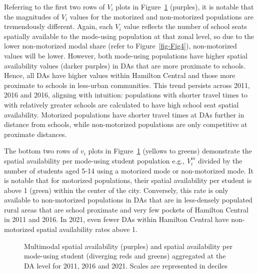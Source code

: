\documentclass[
default
]{sn-jnl}
\begin{document}
Referring to the first two rows of \(V_i\) plots in
Figure~\ref{fig-Fig7} (purples), it is notable that the magnitudes of
\(V_i\) values for the motorized and non-motorized populations are
tremendously different. Again, each \(V_i\) value reflects the number of
school seats spatially available to the mode-using population at that
zonal level, so due to the lower non-motorized modal share (refer to
Figure~\ref{fig-Fig4}), non-motorized values will be lower. However,
both mode-using populations have higher spatial availability values
(darker purples) in DAs that are more proximate to schools. Hence, all
DAs have higher values within Hamilton Central and those more proximate
to schools in less-urban communities. This trend persists across 2011,
2016 and 2016, aligning with intuition: populations with shorter travel
times to with relatively greater schools are calculated to have high
school seat spatial availability. Motorized populations have shorter
travel times at DAs further in distance from schools, while
non-motorized populations are only competitive at proximate distances.

The bottom two rows of \(v_i\) plots in Figure~\ref{fig-Fig7} (yellows
to greens) demonstrate the spatial availability per mode-using student
population e.g., \(V_i^m\) divided by the number of students aged 5-14
using a motorized mode or non-motorized mode. It is notable that for
motorized populations, their spatial availability per student is above 1
(green) within the center of the city. Conversely, this rate is only
available to non-motorized populations in DAs that are in less-densely
populated rural areas that are school proximate and very few pockets of
Hamilton Central in 2011 and 2016. In 2021, even fewer DAs within
Hamilton Central have non-motorized spatial availability rates above 1.

\begin{figure}[H]


\caption{\label{fig-Fig7}Multimodal spatial availability (purples) and
spatial availability per mode-using student (diverging reds and greens)
aggregated at the DA level for 2011, 2016 and 2021. Scales are
represented in deciles}

\end{figure}%
\end{document}
